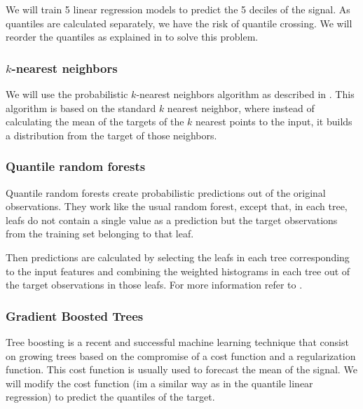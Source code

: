 \documentclass[a4paper,twocolumn,5p]{elsarticle}
\begin{document}
We will train 5 linear regression models to predict the 5 deciles of
the signal. As quantiles are calculated separately, we have the risk
of quantile crossing.  We will reorder the quantiles as explained in
\cite{cross} to solve this problem.

\subsubsection{$k$-nearest neighbors}

We will use the probabilistic $k$-nearest neighbors algorithm as
described in \cite{quantileknnmangalova}.  This algorithm is based on
the standard $k$ nearest neighbor, where instead of calculating the
mean of the targets of the $k$ nearest points to the input, it builds
a distribution from the target of those neighbors.

\subsubsection{Quantile random forests}


Quantile random forests create probabilistic predictions out of the
original observations. They work like the usual random forest, except
that, in each tree, leafs do not contain a single value as a
prediction but the target observations from the training set belonging
to that
leaf.%

Then predictions are calculated by selecting the leafs in each tree
corresponding to the input features and combining the weighted
histograms in each tree out of the target observations in those leafs.
For more information refer to \cite{quantregforests}.

\subsubsection{Gradient Boosted Trees}

Tree boosting \cite{friedman_greedy_2001} is a recent and successful
machine learning technique that consist on growing trees based on the
compromise of a cost function and a regularization function. This cost
function is usually used to forecast the mean of the signal. We will
modify the cost function (im a similar way as in the quantile linear
regression) to predict the quantiles of the target.
\end{document}
